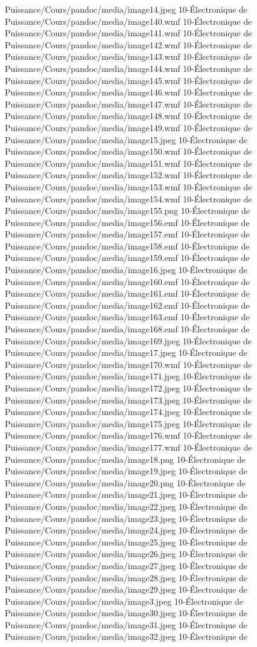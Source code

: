Puissance/Cours/pandoc/media/image14.jpeg 10-Électronique de Puissance/Cours/pandoc/media/image140.wmf 10-Électronique de Puissance/Cours/pandoc/media/image141.wmf 10-Électronique de Puissance/Cours/pandoc/media/image142.wmf 10-Électronique de Puissance/Cours/pandoc/media/image143.wmf 10-Électronique de Puissance/Cours/pandoc/media/image144.wmf 10-Électronique de Puissance/Cours/pandoc/media/image145.wmf 10-Électronique de Puissance/Cours/pandoc/media/image146.wmf 10-Électronique de Puissance/Cours/pandoc/media/image147.wmf 10-Électronique de Puissance/Cours/pandoc/media/image148.wmf 10-Électronique de Puissance/Cours/pandoc/media/image149.wmf 10-Électronique de Puissance/Cours/pandoc/media/image15.jpeg 10-Électronique de Puissance/Cours/pandoc/media/image150.wmf 10-Électronique de Puissance/Cours/pandoc/media/image151.wmf 10-Électronique de Puissance/Cours/pandoc/media/image152.wmf 10-Électronique de Puissance/Cours/pandoc/media/image153.wmf 10-Électronique de Puissance/Cours/pandoc/media/image154.wmf 10-Électronique de Puissance/Cours/pandoc/media/image155.png 10-Électronique de Puissance/Cours/pandoc/media/image156.emf 10-Électronique de Puissance/Cours/pandoc/media/image157.emf 10-Électronique de Puissance/Cours/pandoc/media/image158.emf 10-Électronique de Puissance/Cours/pandoc/media/image159.emf 10-Électronique de Puissance/Cours/pandoc/media/image16.jpeg 10-Électronique de Puissance/Cours/pandoc/media/image160.emf 10-Électronique de Puissance/Cours/pandoc/media/image161.emf 10-Électronique de Puissance/Cours/pandoc/media/image162.emf 10-Électronique de Puissance/Cours/pandoc/media/image163.emf 10-Électronique de Puissance/Cours/pandoc/media/image168.emf 10-Électronique de Puissance/Cours/pandoc/media/image169.jpeg 10-Électronique de Puissance/Cours/pandoc/media/image17.jpeg 10-Électronique de Puissance/Cours/pandoc/media/image170.wmf 10-Électronique de Puissance/Cours/pandoc/media/image171.jpeg 10-Électronique de Puissance/Cours/pandoc/media/image172.jpeg 10-Électronique de Puissance/Cours/pandoc/media/image173.jpeg 10-Électronique de Puissance/Cours/pandoc/media/image174.jpeg 10-Électronique de Puissance/Cours/pandoc/media/image175.jpeg 10-Électronique de Puissance/Cours/pandoc/media/image176.wmf 10-Électronique de Puissance/Cours/pandoc/media/image177.wmf 10-Électronique de Puissance/Cours/pandoc/media/image18.png 10-Électronique de Puissance/Cours/pandoc/media/image19.jpeg 10-Électronique de Puissance/Cours/pandoc/media/image20.png 10-Électronique de Puissance/Cours/pandoc/media/image21.jpeg 10-Électronique de Puissance/Cours/pandoc/media/image22.jpeg 10-Électronique de Puissance/Cours/pandoc/media/image23.jpeg 10-Électronique de Puissance/Cours/pandoc/media/image24.jpeg 10-Électronique de Puissance/Cours/pandoc/media/image25.jpeg 10-Électronique de Puissance/Cours/pandoc/media/image26.jpeg 10-Électronique de Puissance/Cours/pandoc/media/image27.jpeg 10-Électronique de Puissance/Cours/pandoc/media/image28.jpeg 10-Électronique de Puissance/Cours/pandoc/media/image29.jpeg 10-Électronique de Puissance/Cours/pandoc/media/image3.jpeg 10-Électronique de Puissance/Cours/pandoc/media/image30.jpeg 10-Électronique de Puissance/Cours/pandoc/media/image31.jpeg 10-Électronique de Puissance/Cours/pandoc/media/image32.jpeg 10-Électronique de 